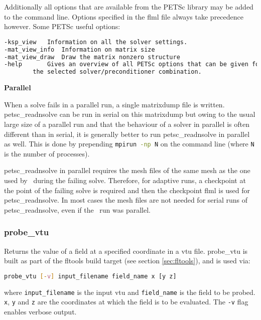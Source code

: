 Additionally all options that are available from the PETSc library may be added to the command line. Options specified in the flml file always take precedence however. Some PETSc useful options:

\begin{lstlisting}[language = Bash]
-ksp_view 	Information on all the solver settings.
-mat_view_info 	Information on matrix size
-mat_view_draw 	Draw the matrix nonzero structure
-help 		Gives an overview of all PETSc options that can be given for 
		the selected solver/preconditioner combination. 
\end{lstlisting} 

{\bf Parallel}


When a solve fails in a parallel run, a single matrixdump file is written. petsc\_readnsolve can be run in serial on this matrixdump but owing to the usual large size of a parallel run and that the behaviour of a solver in parallel is often different than in serial, it is generally better to run petsc\_readnsolve in parallel as well. This is done by prepending \lstinline[language = Bash]+mpirun -np N+ on the command line (where \lstinline[language = Bash]+N+ is the number of processes).

petsc\_readnsolve in parallel requires the mesh files of the same mesh as the one used by \fluidity\ during the failing solve. Therefore, for adaptive runs, a checkpoint at the point of the failing solve is required and then the checkpoint flml is used for petsc\_readnsolve. In most cases the mesh files are not needed for serial runs of petsc\_readnsolve, even if the \fluidity\ run was parallel.


\subsubsection{probe\_vtu}
\label{sec:probe_vtu}

Returns the value of a field at a specified coordinate in a vtu file.
probe\_vtu is built as part of the fltools
build target (see section \ref{sec:fltools}), and is used via:

\begin{lstlisting}[language = Bash]
probe_vtu [-v] input_filename field_name x [y z]
\end{lstlisting}

where \lstinline[language = Bash]+input_filename+ is the input vtu and
\lstinline[language = Bash]+field_name+ is the field to be probed. 
\lstinline[language = Bash]+x+, \lstinline[language = Bash]+y+ and
\lstinline[language = Bash]+z+ are the coordinates at which the field is to
be evaluated. The \lstinline[language = Bash]+-v+ flag enables verbose output.

